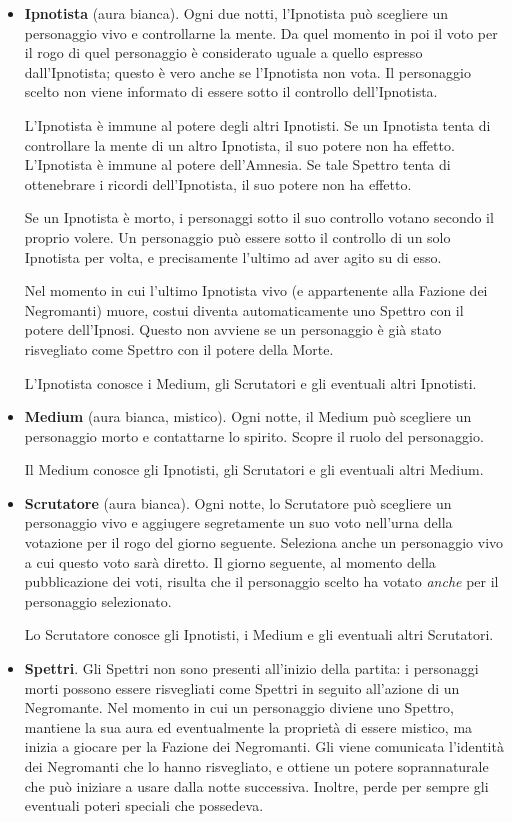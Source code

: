 \documentclass[a4paper,10pt]{article}
\begin{document}
\begin{itemize}
 \item {\bf Ipnotista} (aura bianca). Ogni due notti, l'Ipnotista può scegliere
un personaggio vivo e controllarne la mente.
 Da quel momento in poi il voto per il rogo di quel personaggio è considerato
uguale a quello espresso dall'Ipnotista; questo è vero anche se l'Ipnotista non
vota.
 Il personaggio scelto non viene informato di essere sotto il controllo
dell'Ipnotista.
 
 L'Ipnotista è immune al potere degli altri Ipnotisti. Se un Ipnotista tenta di
controllare la mente di un altro Ipnotista, il suo potere non ha effetto.
 L'Ipnotista è immune al potere dell'Amnesia. Se tale Spettro tenta di
ottenebrare i ricordi dell'Ipnotista, il suo potere non ha effetto.

 Se un Ipnotista è morto, i personaggi sotto il suo controllo votano secondo il
proprio volere.
 Un personaggio può essere sotto il controllo di un solo Ipnotista per volta, e
precisamente l'ultimo ad aver agito su di esso.

Nel momento in cui l'ultimo Ipnotista vivo (e appartenente alla Fazione dei Negromanti)
muore, costui diventa automaticamente uno Spettro con il potere dell'Ipnosi. Questo non avviene se 
un personaggio è già stato risvegliato come Spettro con il potere della Morte.

 L'Ipnotista conosce i Medium, gli Scrutatori e gli eventuali altri Ipnotisti.

 \item {\bf Medium} (aura bianca, mistico). Ogni notte, il Medium può scegliere
un personaggio morto e contattarne lo spirito. Scopre il ruolo del personaggio.

 Il Medium conosce gli Ipnotisti, gli Scrutatori e gli eventuali altri Medium.
 
 \item {\bf Scrutatore} (aura bianca). Ogni notte, lo Scrutatore può scegliere
 un personaggio vivo e aggiugere segretamente un suo voto nell'urna della votazione per il rogo
 del giorno seguente. Seleziona anche un personaggio vivo a cui questo voto sarà diretto.
 Il giorno seguente, al momento della pubblicazione dei voti, risulta che il
 personaggio scelto ha votato \emph{anche} per il personaggio selezionato.
 
 Lo Scrutatore conosce gli Ipnotisti, i Medium e gli eventuali altri Scrutatori.

 \item {\bf Spettri}. Gli Spettri non sono presenti all'inizio della partita: i
personaggi morti possono essere risvegliati come Spettri in seguito all'azione
di un Negromante.
Nel momento in cui un personaggio diviene uno Spettro, mantiene la sua aura ed
eventualmente la proprietà di essere mistico, ma inizia a giocare per la
Fazione dei Negromanti. Gli viene comunicata l'identità dei Negromanti che lo
hanno risvegliato, e ottiene un potere soprannaturale che può iniziare a usare
dalla notte successiva. Inoltre, perde per sempre gli eventuali poteri speciali
che possedeva.
 

\end{itemize}
\end{document}
